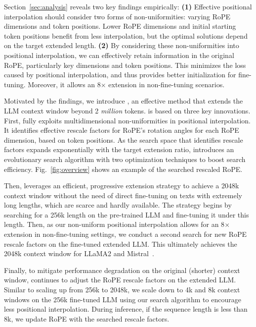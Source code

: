 \documentclass{article}
\theoremstyle{plain}
\theoremstyle{definition}
\theoremstyle{remark}
\begin{document}
Section~\ref{sec:analysis} reveals two key findings empirically: \textbf{(1)} Effective positional interpolation should consider two forms of non-uniformities: varying RoPE dimensions and token positions. Lower RoPE dimensions and initial starting token positions benefit from less interpolation, but the optimal solutions depend on the target extended length.
  \textbf{(2)} By considering these non-uniformities into positional interpolation, we can effectively retain information in the original RoPE,  particularly key dimensions and token positions. This minimizes the loss caused by positional interpolation, and thus provides better initialization for fine-tuning. Moreover, it  allows an 8$\times$ extension in non-fine-tuning scenarios. 

  
  Motivated by the findings, we introduce \textbf{\sysname},  an effective method 
  that extends the LLM context window beyond 2 \emph{million} tokens.  {\sysname} is based on three key innovations. First, \sysname{} fully exploits multidimensional non-uniformities in positional interpolation. 
  It identifies effective rescale factors for RoPE's rotation angles for each RoPE dimension, based on token positions. 
  As the search space that identifies rescale factors expands exponentially with the target extension ratio, \sysname{} introduces an evolutionary search algorithm with two optimization techniques to boost search efficiency. Fig.~\ref{fig:overview} shows an example of the searched  rescaled RoPE.
  
  
 Then, \sysname{} leverages an efficient, progressive extension strategy to achieve a 2048k context window without the need of direct fine-tuning on texts with extremely long lengths, which are scarce and hardly available. The strategy begins by searching for a 256k length on the pre-trained LLM and fine-tuning it under this length. Then, as our non-uniform positional interpolation allows for an 8$\times$ extension in non-fine-tuning settings, we conduct a second search for new RoPE rescale factors on the fine-tuned extended LLM. This ultimately achieves the 2048k context window for LLaMA2 and Mistral~\cite{mistral}.
 
Finally, 
to mitigate performance degradation on the original (shorter) context window,
\sysname{} continues to adjust 
the RoPE rescale factors on the extended LLM. 
Similar to scaling up from 256k to 2048k, we scale down to 4k and 8k context windows on the 256k fine-tuned LLM using our search algorithm to encourage less positional interpolation. During inference, if the sequence length is less than 8k, we update RoPE with the searched rescale factors. 
\end{document}
